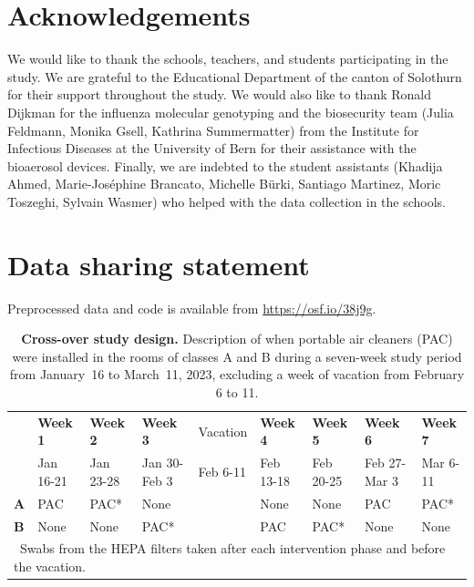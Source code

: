 \documentclass[fleqn,11pt]{wlscirep}
\begin{document}
\section*{Acknowledgements}
We would like to thank the schools, teachers, and students participating in the study. We are grateful to the Educational Department of the canton of Solothurn for their support throughout the study. We would also like to thank Ronald Dijkman for the influenza molecular genotyping and the biosecurity team (Julia Feldmann, Monika Gsell, Kathrina Summermatter) from the Institute for Infectious Diseases at the University of Bern for their assistance with the bioaerosol devices. Finally, we are indebted to the student assistants (Khadija Ahmed, Marie-Joséphine Brancato, Michelle Bürki, Santiago Martinez, Moric Toszeghi, Sylvain Wasmer) who helped with the data collection in the schools.

\section*{Data sharing statement}
Preprocessed data and code is available from \url{https://osf.io/38j9g}.



\clearpage

\begin{table}[!htpb]
    \footnotesize
    \centering
    \caption{\textbf{Cross-over study design.} Description of when portable air cleaners (PAC) were installed in the rooms of classes A and B during a seven-week study period from January~16 to March~11, 2023, excluding a week of vacation from February 6 to 11.}\label{tab:study_design}
    \begin{tabular}{l l l l l l l l l}
    \toprule
      & \textbf{Week 1} & \textbf{Week 2} & \textbf{Week 3} & Vacation & \textbf{Week 4} & \textbf{Week 5} & \textbf{Week 6} & \textbf{Week 7} \\
      & Jan 16-21 & Jan 23-28 & Jan 30-Feb 3 & Feb 6-11 & Feb 13-18 & Feb 20-25 & Feb 27-Mar 3 & Mar 6-11 \\
      \midrule
      \textbf{A} & \cellcolor{gray!50} PAC & \cellcolor{gray!50} PAC\hphantom{000}*& \cellcolor{gray!10} None & & \cellcolor{gray!10} None & \cellcolor{gray!10} None & \cellcolor{gray!50} PAC & \cellcolor{gray!50} PAC\hphantom{0000}* \\
      \textbf{B} & \cellcolor{gray!10} None & \cellcolor{gray!10} None & \cellcolor{gray!50} PAC\hphantom{00000}* & & \cellcolor{gray!50} PAC & \cellcolor{gray!50} PAC\hphantom{000}*& \cellcolor{gray!10} None & \cellcolor{gray!10} None \\
      \bottomrule
      \multicolumn{9}{l}{\scriptsize *~Swabs from the HEPA filters taken after each intervention phase and before the vacation.}
    \end{tabular}
\end{table}
\end{document}
